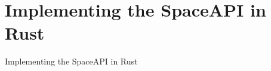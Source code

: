 \section{Implementing the SpaceAPI in Rust}

\begin{frame}[c]{Implementing the SpaceAPI in Rust}
\end{frame}

